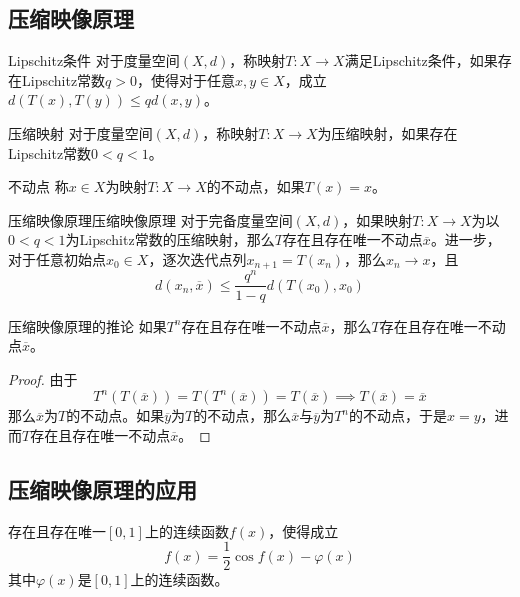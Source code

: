 \documentclass[lang = cn, scheme = chinese, thmcnt = section]{elegantbook}
\begin{document}
\subsection{压缩映像原理}

\begin{definition}{Lipschitz条件}
	对于度量空间$(X,d)$，称映射$T:X\to X$满足Lipschitz条件，如果存在Lipschitz常数$q>0$，使得对于任意$x,y\in X$，成立$d(T(x),T(y))\le qd(x,y)$。
\end{definition}

\begin{definition}{压缩映射}
	对于度量空间$(X,d)$，称映射$T:X\to X$为压缩映射，如果存在Lipschitz常数$0<q<1$。
\end{definition}

\begin{definition}{不动点}
	称$x\in X$为映射$T:X\to X$的不动点，如果$T(x)=x$。
\end{definition}

\begin{theorem}{压缩映像原理}{压缩映像原理}
	对于完备度量空间$(X,d)$，如果映射$T:X\to X$为以$0<q<1$为Lipschitz常数的压缩映射，那么$T$存在且存在唯一不动点$\overline{x}$。进一步，对于任意初始点$x_0\in X$，逐次迭代点列$x_{n+1}=T(x_n)$，那么$x_n\to x$，且
	$$
	d(x_n,\overline{x})\le \frac{q^n}{1-q}d(T(x_0),x_0)
	$$
\end{theorem}

\begin{corollary}{}{压缩映像原理的推论}
	如果$T^{n}$存在且存在唯一不动点$\overline{x}$，那么$T$存在且存在唯一不动点$\overline{x}$。
\end{corollary}

\begin{proof}
	由于
	$$
	T^{n}(T(\overline{x}))=T(T^n(\overline{x}))=T(\overline{x})\implies T(\overline{x})=\overline{x}
	$$
	那么$\overline{x}$为$T$的不动点。如果$\overline{y}$为$T$的不动点，那么$\overline{x}$与$\overline{y}$为$T^n$的不动点，于是$x=y$，进而$T$存在且存在唯一不动点$\overline{x}$。
\end{proof}

\subsection{压缩映像原理的应用}

\begin{proposition}
	存在且存在唯一$[0,1]$上的连续函数$f(x)$，使得成立
	$$
	f(x)=\frac{1}{2}\cos f(x)-\varphi(x)
	$$
	其中$\varphi(x)$是$[0,1]$上的连续函数。
\end{proposition}
\end{document}
